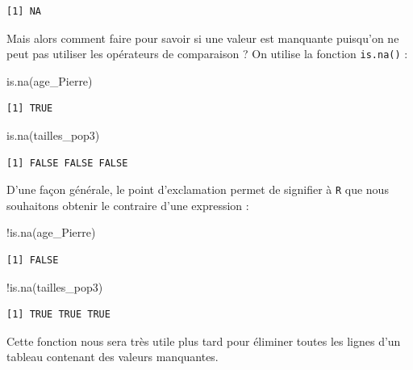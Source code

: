 \documentclass[
  a4paper,
  DIV=11,
  numbers=noendperiod,
  oneside]{scrreprt}
\newenvironment{Shaded}{}{}
\newcommand{\FunctionTok}[1]{\textcolor[rgb]{0.44,0.26,0.76}{#1}}
\newcommand{\NormalTok}[1]{\textcolor[rgb]{0.14,0.16,0.18}{#1}}
\newcommand{\SpecialCharTok}[1]{\textcolor[rgb]{0.00,0.36,0.77}{#1}}
\begin{document}
\begin{verbatim}
[1] NA
\end{verbatim}

Mais alors comment faire pour savoir si une valeur est manquante
puisqu'on ne peut pas utiliser les opérateurs de comparaison ? On
utilise la fonction \texttt{is.na()} :

\begin{Shaded}
\begin{Highlighting}[]
\FunctionTok{is.na}\NormalTok{(age\_Pierre)}
\end{Highlighting}
\end{Shaded}

\begin{verbatim}
[1] TRUE
\end{verbatim}

\begin{Shaded}
\begin{Highlighting}[]
\FunctionTok{is.na}\NormalTok{(tailles\_pop3)}
\end{Highlighting}
\end{Shaded}

\begin{verbatim}
[1] FALSE FALSE FALSE
\end{verbatim}

D'une façon générale, le point d'exclamation permet de signifier à
\texttt{R} que nous souhaitons obtenir le contraire d'une expression :

\begin{Shaded}
\begin{Highlighting}[]
\SpecialCharTok{!}\FunctionTok{is.na}\NormalTok{(age\_Pierre)}
\end{Highlighting}
\end{Shaded}

\begin{verbatim}
[1] FALSE
\end{verbatim}

\begin{Shaded}
\begin{Highlighting}[]
\SpecialCharTok{!}\FunctionTok{is.na}\NormalTok{(tailles\_pop3)}
\end{Highlighting}
\end{Shaded}

\begin{verbatim}
[1] TRUE TRUE TRUE
\end{verbatim}

Cette fonction nous sera très utile plus tard pour éliminer toutes les
lignes d'un tableau contenant des valeurs manquantes.
\end{document}
